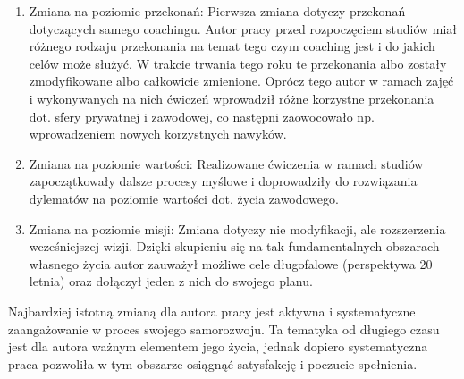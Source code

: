 \begin{enumerate}
  \item Zmiana na poziomie przekonań: Pierwsza zmiana dotyczy przekonań dotyczących samego coachingu. Autor pracy przed rozpoczęciem
      studiów miał różnego rodzaju przekonania na temat tego czym coaching jest i do jakich celów może służyć. W trakcie trwania
      tego roku te przekonania albo zostały zmodyfikowane albo całkowicie zmienione. Oprócz tego autor w ramach zajęć i wykonywanych
      na nich ćwiczeń wprowadził różne korzystne przekonania dot. sfery prywatnej i zawodowej, co następni zaowocowało np. wprowadzeniem nowych
      korzystnych nawyków.

  \item Zmiana na poziomie wartości: Realizowane ćwiczenia w ramach studiów zapoczątkowały dalsze procesy myślowe i doprowadziły do
      rozwiązania dylematów na poziomie wartości dot. życia zawodowego.

  \item Zmiana na poziomie misji: Zmiana dotyczy nie modyfikacji, ale rozszerzenia wcześniejszej wizji. Dzięki skupieniu się na tak fundamentalnych
      obszarach własnego życia autor zauważył możliwe cele długofalowe (perspektywa 20 letnia) oraz dołączył jeden z nich do swojego planu.
\end{enumerate}

Najbardziej istotną zmianą dla autora pracy jest aktywna i systematyczne zaangażowanie w proces swojego samorozwoju. Ta tematyka
od długiego czasu jest dla autora ważnym elementem jego życia, jednak dopiero systematyczna praca pozwoliła w tym obszarze osiągnąć
satysfakcję i poczucie spełnienia.
